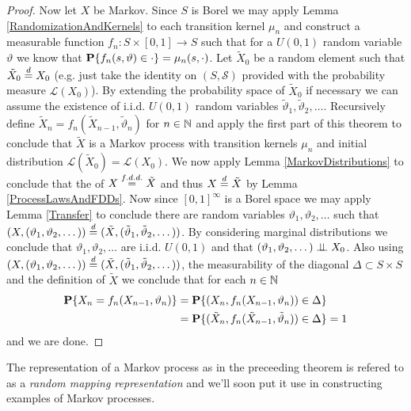 \begin{proof}
Now let $X$ be Markov.  Since $S$ is Borel we may apply Lemma \ref{RandomizationAndKernels}
to each transition kernel $\mu_n$ and construct a measurable function
$f_n : S \times [0,1] \to S$ such that for a $U(0,1)$ random variable
$\vartheta$ we know that $\textbf{P}\{f_n(s, \vartheta) \in \cdot\} = \mu_n(s,
\cdot)$.  Let $\tilde{X}_0$ be a random element such that $\tilde{X}_0
\overset{d}= X_0$ (e.g. just take the identity on $(S, \mathcal{S})$
provided with the probability measure $\mathcal{L}(X_0)$).  By
extending the probability space of $\tilde{X}_0$ if necessary we
can assume the existence of i.i.d. $U(0,1)$ random variables
$\tilde{\vartheta}_1, \tilde{\vartheta}_2, \dotsc$.  Recursively
define $\tilde{X}_n = f_n(\tilde{X}_{n-1}, \tilde{\vartheta}_n)$ for
$n \in \mathbb{N}$ and apply the first part of this theorem to conclude
that $\tilde{X}$ is a Markov process with transition kernels $\mu_n$
and initial distribution $\mathcal{L}(\tilde{X}_0) =
\mathcal{L}(X_0)$.  We now apply Lemma \ref{MarkovDistributions} to
conclude that the of $X \overset{f.d.d.}= \tilde{X}$ and thus $X
\overset{d}= \tilde{X}$ by Lemma \ref{ProcessLawsAndFDDs}.  Now since
$[0,1]^\infty$ is a Borel space we may
apply Lemma \ref{Transfer} to conclude there are
random variables $\vartheta_1, \vartheta_2, \dotsc$ such that $(X,
(\vartheta_1, \vartheta_2, \dotsc)) \overset{d}= (\tilde{X},
(\tilde{\vartheta}_1, \tilde{\vartheta}_2, \dotsc))$.  By considering
marginal distributions we conclude that 
$\vartheta_1, \vartheta_2, \dotsc$ are i.i.d. $U(0,1)$ and that
$(\vartheta_1, \vartheta_2, \dotsc) \perp \! \! \! \perp X_0$. Also using $(X,
(\vartheta_1, \vartheta_2, \dotsc)) \overset{d}= (\tilde{X},
(\tilde{\vartheta}_1, \tilde{\vartheta}_2, \dotsc))$, the
measurability of the diagonal $\Delta \subset S \times S$ and the
definition of $\tilde{X}$ we conclude
that for each $n \in \mathbb{N}$ 
\begin{align*}
\textbf{P}\{X_n = f_n(X_{n-1}, \vartheta_n)\} &= \textbf{P}\{(X_n,
  f_n(X_{n-1}, \vartheta_n)) \in \Delta\} \\
&= \textbf{P}\{(\tilde{X}_n,
  f_n(\tilde{X}_{n-1}, \tilde{\vartheta}_n)) \in \Delta\} = 1
\end{align*}
and we are done.
\end{proof}

The representation of a Markov process as in the preceeding theorem is
refered to as a \emph{random mapping representation} and we'll soon
put it use in constructing examples of Markov processes.

